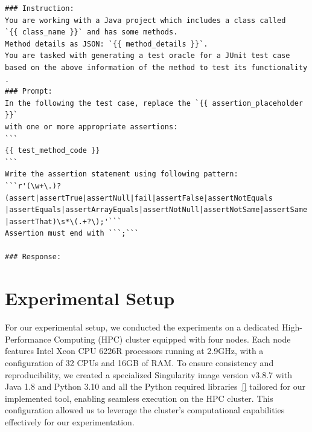 \begin{lstlisting}[style=llm_prompt, label=prompt_template, caption=Prompt Template]
### Instruction:
You are working with a Java project which includes a class called 
`{{ class_name }}` and has some methods.
Method details as JSON: `{{ method_details }}`.
You are tasked with generating a test oracle for a JUnit test case 
based on the above information of the method to test its functionality .
### Prompt:
In the following the test case, replace the `{{ assertion_placeholder }}` 
with one or more appropriate assertions:
```
{{ test_method_code }}
```
Write the assertion statement using following pattern:
```r'(\w+\.)?(assert|assertTrue|assertNull|fail|assertFalse|assertNotEquals
|assertEquals|assertArrayEquals|assertNotNull|assertNotSame|assertSame
|assertThat)\s*\(.+?\);'```
Assertion must end with ```;```

### Response:
\end{lstlisting}

\section{Experimental Setup}
\label{sec:experimental_setup}
\vspace{0.2 cm}

For our experimental setup, we conducted the experiments on a dedicated High-Performance Computing (HPC) cluster equipped with four nodes. Each node features Intel Xeon CPU 6226R\cite{noauthor_intel_nodate} processors running at 2.9GHz, with a configuration of 32 CPUs and 16GB of RAM. To ensure consistency and reproducibility, we created a specialized Singularity\cite{noauthor_introduction_nodate} image version v3.8.7\cite{noauthor_singularity_releases_nodate} with Java 1.8 and Python 3.10 and all the Python required libraries~\ref{} tailored for our implemented tool, enabling seamless execution on the HPC cluster. This configuration allowed us to leverage the cluster's computational capabilities effectively for our experimentation.

